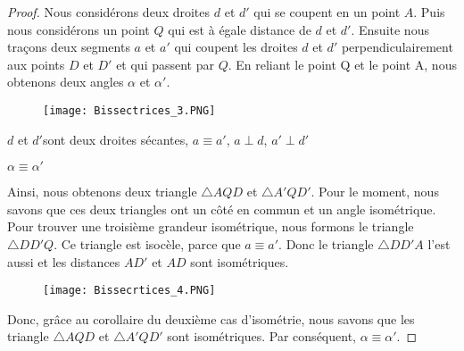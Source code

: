 \documentclass[a4paper,12pt]{article}
\begin{document}
\begin{proof}
Nous considérons deux droites $d$ et $d'$ qui se coupent en un point $A$. Puis nous considérons un point $Q$ qui est à égale distance de $d$ et $d'$. Ensuite nous traçons deux segments $a$ et $a'$ qui coupent les droites $d$ et $d'$ perpendiculairement aux points $D$ et $D'$ et qui passent par $Q$. En reliant le point Q et le point A, nous obtenons deux angles $\alpha$ et $\alpha'$.

 \begin{figure}[H]
    \centering
    \texttt{[image: Bissectrices\_3.PNG]}
\end{figure}


\begin{hyp}
$d$ et $d'$sont deux droites sécantes, $a\equiv a'$, $a\perp d$, $a' \perp d'$
\end{hyp}
\begin{concl}
$\alpha \equiv \alpha'$
\end{concl}
Ainsi, nous obtenons deux triangle $\triangle AQD$ et $\triangle A'QD'$. Pour le moment, nous savons que ces deux triangles ont un côté en commun et un angle isométrique. Pour trouver une troisième grandeur isométrique, nous formons le triangle $\triangle DD'Q$. Ce triangle est isocèle, parce que $a\equiv a'$. Donc le triangle $\triangle DD'A$ l'est aussi et les distances $AD'$ et $AD$ sont isométriques. 

 \begin{figure}[H]
    \centering
    \texttt{[image: Bissecrtices\_4.PNG]}
\end{figure}


Donc, grâce au corollaire du deuxième cas d'isométrie, nous savons que les triangle $\triangle AQD$ et $\triangle A'QD'$ sont isométriques. Par conséquent, $\alpha \equiv \alpha'$.
\end{proof}
\end{document}
